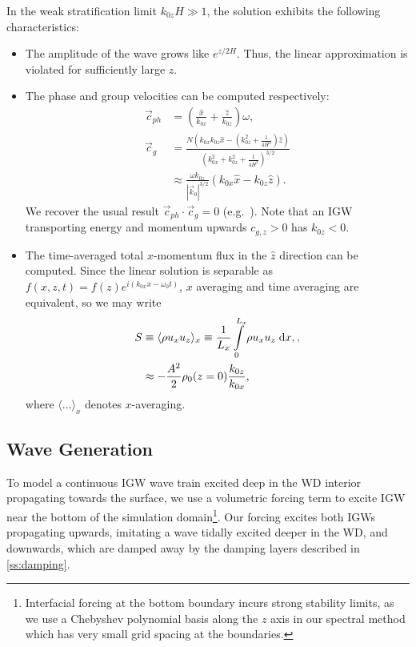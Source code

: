 \documentclass[
        fleqn,
        usenatbib,
    ]{mnras}
\newcommand*{\abs}[1]{\left|#1\right|}
\newcommand*{\ev}[1]{\langle#1\rangle}
\newcommand*{\p}[1]{\left(#1\right)}
\begin{document}
In the weak stratification limit $k_{0z}H \gg 1$, the solution exhibits the
following characteristics:
\begin{itemize}
    \item The amplitude of the wave grows like $e^{z/2H}$. Thus, the
        linear approximation is violated for sufficiently large $z$.

    \item The phase and group velocities can be computed respectively:
        \begin{align}
            \vec{c}_{ph} &=
                \p{\frac{\hat{x}}{k_{0x}} + \frac{\hat{z}}{k_{0z}}}\omega,\\
            \vec{c}_{g} &= \frac{N\p{k_{0x}k_{0z}\hat{x}
                - \p{k_{0z}^2 + \frac{1}{4H^2}}\hat{z}}}
                {\p{k_{0x}^2 + k_{0z}^2 + \frac{1}{4H^2}}^{3/2}} \nonumber\\
                &\approx \frac{\omega k_{0z}}{\abs{\vec{k}_0}^{3/2}}
                    \p{k_{0x}\hat{x} - k_{0z}\hat{z}}.
        \end{align}
        We recover the usual result $\vec{c}_{ph} \cdot \vec{c}_g = 0$
        (e.g.\  \citep{drazin,sutherland1}). Note that an IGW transporting energy
        and momentum upwards $c_{g, z} > 0$ has $k_{0z} < 0$.

    \item The time-averaged total $x$-momentum flux in the $\hat{z}$ direction
        can be computed. Since the linear solution is separable as $f(x, z, t) =
        f(z)e^{i(k_{0x}x - \omega_0 t)}$, $x$ averaging and time averaging are
        equivalent, so we may write
        \begin{align}
            S &\equiv \ev{\rho u_x u_z}_x \equiv
                \frac{1}{L_x}\int_0^{L_x}\limits \rho u_x u_z\;\mathrm{d}x,
                    \label{eq:S_def},\\
                &\approx -\frac{A^2}{2}\rho_0(z=0)\frac{k_{0z}}{k_{0x}},
                    \label{eq:S_lin}
        \end{align}
        where $\ev{\dots}_x$ denotes $x$-averaging.
\end{itemize}

\subsection{Wave Generation}

To model a continuous IGW wave train excited deep in the WD interior propagating
towards the surface, we use a volumetric forcing term to excite IGW near the
bottom of the simulation domain\footnote{Interfacial forcing at the bottom
boundary incurs strong stability limits, as we use a Chebyshev polynomial basis
along the $z$ axis in our spectral method which has very small grid spacing at
the boundaries.}. Our forcing excites both IGWs propagating upwards, imitating a
wave tidally excited deeper in the WD, and downwards, which are damped away by
the damping layers described in \autoref{ss:damping}.
\end{document}
